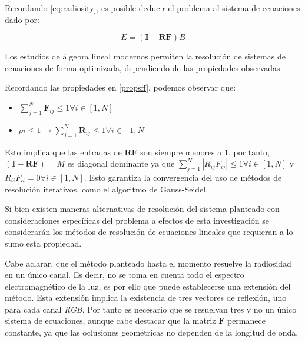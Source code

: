 Recordando \eqref{eq:radiosity}, es posible deducir el problema al sistema de ecuaciones dado por:

\begin{equation}
	E = (\mathbf{I} - \mathbf{RF})B
\end{equation}

Los estudios de álgebra lineal modernos permiten la resolución de sistemas de ecuaciones de forma optimizada, dependiendo de las propiedades observadas.

Recordando las propiedades en \ref{propsff}, podemos observar que:

\begin{itemize}
	\item $\sum_{j=1}^{N} \mathbf{F}_{ij} \leq 1 \forall{i \in [1,N]}$
	\item $\rho{i} \leq 1 \rightarrow \sum_{j=1}^{N} \mathbf{R}_{ij} \leq 1 \forall{i \in [1,N]}$
\end{itemize}

Esto implica que las entradas de $\mathbf{RF}$ son siempre menores a $1$, por tanto, $(\mathbf{I} - \mathbf{RF}) = M$ es diagonal dominante ya que $\sum_{j=1}^{N}|R_{ij}F_{ij}| \le 1 \forall i \in [1, N]$ y $R_{ii}F_{ii} = 0  \forall i \in [1,N]$. Esto garantiza la convergencia del uso de métodos de resolución iterativos, como el algoritmo de Gauss-Seidel.

Si bien existen maneras alternativas de resolución del sistema planteado con consideraciones específicas del problema a efectos de esta investigación se considerarán los métodos de resolución de ecuaciones lineales que requieran a lo sumo esta propiedad.

Cabe aclarar, que el método planteado hasta el momento resuelve la radiosidad en un único canal. Es decir, no se toma en cuenta todo el espectro electromagnético de la luz, es por ello que puede establecerse una extensión del método. Esta extensión implica la existencia de tres vectores de reflexión, uno para cada canal \textit{RGB}. Por tanto es necesario que se resuelvan tres y no un único sistema de ecuaciones, aunque cabe destacar que la matriz $\mathbf{F}$ permanece constante, ya que las oclusiones geométricas no dependen de la longitud de onda.
